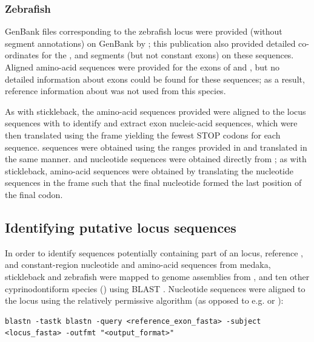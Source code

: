 \subsubsection{Zebrafish}
\label{sec:ref_locus_dre}

GenBank files corresponding to the zebrafish \igh{} locus were provided (without segment annotations) on GenBank by \parencite{danilova2005zebrafish}; this publication also provided detailed co-ordinates for the \vh, \dh and \jh segments (but not constant exons) on these sequences. Aligned amino-acid sequences were provided for the exons of  and , but no detailed information about  exons could be found for these sequences; as a result, reference information about  was not used from this species.

As with stickleback, the amino-acid sequences provided were aligned to the locus sequences  with  to identify and extract exon nucleic-acid sequences, which were then translated using the frame yielding the fewest STOP codons for each sequence. \vh sequences were obtained using the ranges provided in \parencite{danilova2005zebrafish} and translated in the same manner. \dh and \jh nucleotide sequences were obtained directly from \parencite{danilova2005zebrafish}; as with stickleback, \jh amino-acid sequences were obtained by translating the nucleotide sequences in the frame such that the final nucleotide formed the last position of the final codon.

\subsection{Identifying putative locus sequences}
\label{sec:locus_scaffolds}

In order to identify sequences potentially containing part of an \igh{} locus, reference \vh, \jh and constant-region nucleotide and amino-acid sequences from medaka, stickleback and zebrafish were mapped to genome assemblies from \Nfu, \Xma and ten other cyprinodontiform species () using BLAST \parencite{altschul1990blast,altschul1997blast}. Nucleotide sequences were aligned to the locus using the relatively permissive  algorithm (as opposed to e.g.  or ):

\begin{lstlisting}
blastn -tastk blastn -query <reference_exon_fasta> -subject <locus_fasta> -outfmt "<output_format>"
\end{lstlisting}

